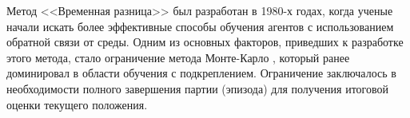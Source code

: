 Метод <<Временная разница>> был разработан в 1980-х годах, когда ученые начали искать более эффективные способы обучения агентов с использованием обратной связи от среды. Одним из основных факторов, приведших к разработке этого метода, стало ограничение метода Монте-Карло \cite{amm-first-article}, который ранее доминировал в области обучения с подкреплением. Ограничение заключалось в необходимости полного завершения партии (эпизода) для получения итоговой оценки текущего положения.
